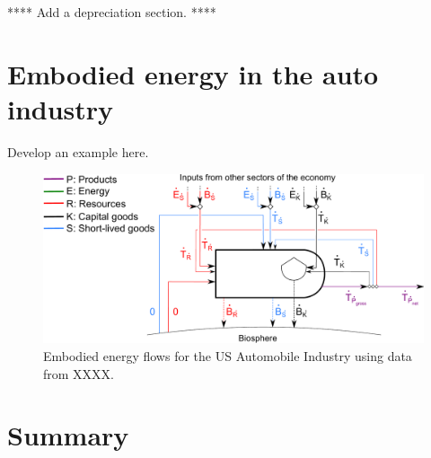 **** Add a depreciation section. ****


\section{Embodied energy in the auto industry}
\label{sec:embodied_energy_auto}

Develop an example here.

\begin{figure}[h!]
\centering
\includegraphics[width=0.8\linewidth]{Part_2/Chapter_Embodied/images/PERKS_basic_unit_embodied_energy_content_auto_ind.pdf}
\caption{Embodied energy flows for the US Automobile Industry using data from XXXX.}
\label{fig:PERKS_energy_auto}
\end{figure}

\section{Summary}
\label{sec:embodied_energy_summary}








%
%

